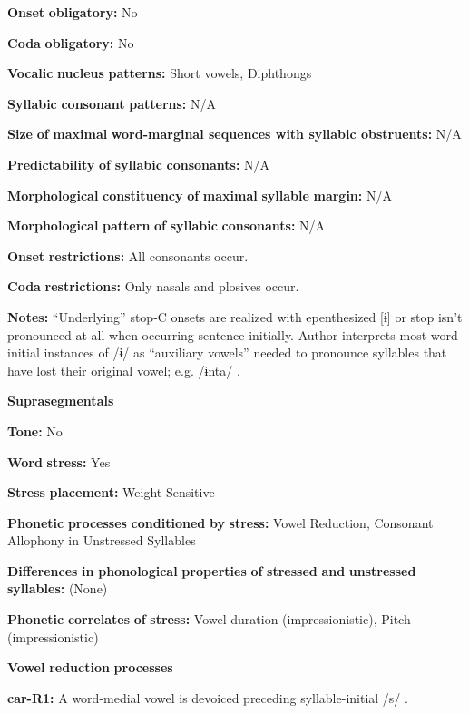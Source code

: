 \textbf{Onset} \textbf{obligatory:} No

\textbf{Coda} \textbf{obligatory:} No

\textbf{Vocalic} \textbf{nucleus} \textbf{patterns:} Short vowels, Diphthongs

\textbf{Syllabic} \textbf{consonant} \textbf{patterns:} N/A

\textbf{Size} \textbf{of} \textbf{maximal} \textbf{word{}-marginal sequences with syllabic obstruents:} N/A

\textbf{Predictability} \textbf{of} \textbf{syllabic} \textbf{consonants:} N/A

\textbf{Morphological} \textbf{constituency} \textbf{of} \textbf{maximal} \textbf{syllable} \textbf{margin:} N/A

\textbf{Morphological} \textbf{pattern} \textbf{of} \textbf{syllabic} \textbf{consonants:} N/A

\textbf{Onset} \textbf{restrictions:} All consonants occur.

\textbf{Coda} \textbf{restrictions:} Only nasals and plosives occur.

\textbf{Notes:} “Underlying” stop-C onsets are realized with epenthesized [ɨ] or stop isn’t pronounced at all when occurring sentence-initially. Author interprets most word-initial instances of /ɨ/ as “auxiliary vowels” needed to pronounce syllables that have lost their original vowel; e.g. /ɨnta/ \citep[26]{Courtz2008}.

\textbf{Suprasegmentals}

\textbf{Tone:} No

\textbf{Word} \textbf{stress:} Yes

\textbf{Stress} \textbf{placement:} Weight-Sensitive

\textbf{Phonetic} \textbf{processes} \textbf{conditioned} \textbf{by} \textbf{stress:} Vowel Reduction, Consonant Allophony in Unstressed Syllables

\textbf{Differences} \textbf{in} \textbf{phonological} \textbf{properties} \textbf{of} \textbf{stressed} \textbf{and} \textbf{unstressed} \textbf{syllables:} (None)

\textbf{Phonetic} \textbf{correlates} \textbf{of} \textbf{stress:} Vowel duration (impressionistic), Pitch (impressionistic)

\textbf{Vowel} \textbf{reduction} \textbf{processes}

\textbf{car-R1:} A word-medial vowel is devoiced preceding syllable-initial /s/ \citep[38]{Peasgood1972}.

